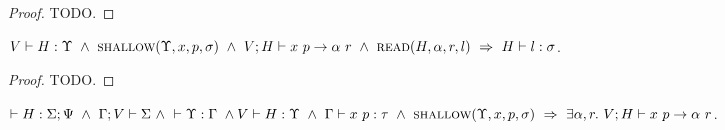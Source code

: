 \documentclass{article}
\begin{document}
\begin{proof}
  TODO.
\end{proof}

\begin{lem}
  $\Type{V}{H}{\Upsilon}\ \land\ \Shallow{\Upsilon}{x}{p}{\sigma}\ \land\
   \PEval{V}{H}{x}{p}{\alpha}{r}\ \land\ \Read{H}{\alpha}{r}{l}\ \Rightarrow\
   \Type{H}{l}{\sigma}$.
\end{lem}

\begin{proof}
  TODO.
\end{proof}

\begin{lem}
  $\HWF{H}{\Sigma}{\Psi}\ \land\ \SWF{\Gamma}{V}{\Sigma}\ \land\
   \YWF{\Upsilon}{\Gamma}\ \land\ \\ \Type{V}{H}{\Upsilon}\ \land\ 
   \PType{\Gamma}{x}{p}{\tau}\ \land\ \Shallow{\Upsilon}{x}{p}{\sigma}\ 
   \Rightarrow\ \exists \alpha, r.\ \PEval{V}{H}{x}{p}{\alpha}{r}$.
\end{lem}
\end{document}
